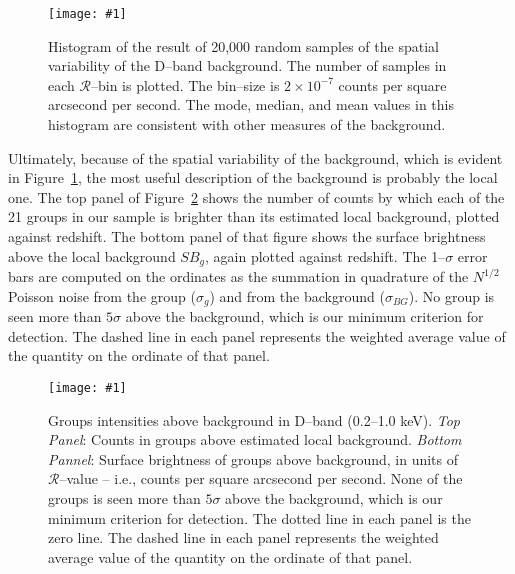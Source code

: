 \documentclass[12pt,preprint]{aastex}
\def\plotone#1{\centering \leavevmode
\texttt{[image: \#1]}}
\newcommand{\R}[0]{\mathcal{R}}
\begin{document}
\begin{figure}[thb]
\plotone{figs/histfig.eps}
\caption{Histogram of the result of 
20,000 random samples of the spatial variability of the D--band background.
The number of samples in each $\R$--bin is plotted.  The bin--size is
$2\times 10^{-7}$ counts per square arcsecond per second.  The mode, median,
and mean values in this histogram are consistent with other measures of the
background.
}
\label{fig:histfig}
\end{figure}

Ultimately, because of the spatial variability of the background, 
which is evident
in Figure~\ref{fig:histfig}, the most useful description of the background
is probably the local one.  The top panel of Figure~\ref{fig:diffplot} shows
the number of counts by which each of the 21 groups in our sample is brighter
than its estimated local background, plotted against redshift.
The bottom panel of that figure shows the surface brightness above the local
background $SB_g$, again plotted against redshift.
The 1--$\sigma$ error bars are computed on the ordinates as the summation in
quadrature of the $N^{1/2}$ Poisson noise from the group ($\sigma_g$) and from
the background ($\sigma_{BG}$).  No group is seen more than $5\sigma$ above
the background, which is our minimum criterion for detection.  The dashed line
in each panel represents the weighted average value of the
quantity on the ordinate of that panel.

\begin{figure}[thb]
\plotone{figs/groupsintensity.eps}
\caption{Groups intensities above background in D--band (0.2--1.0 keV).
{\it Top Panel}: Counts in groups above estimated local background.
{\it Bottom Pannel}: Surface brightness of groups above background, in units of
$\R$--value -- i.e., counts per square arcsecond per second.
None of the groups is seen more than $5\sigma$ above the background, which is
our minimum criterion for detection.  The dotted line in each panel is the
zero line.  The dashed line in each panel represents the weighted average value
of the quantity on the ordinate of that panel.}
\label{fig:diffplot}
\end{figure}
\end{document}
